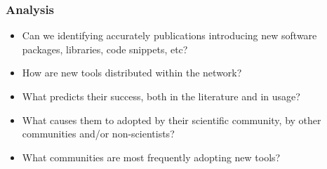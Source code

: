 \documentclass{beamer}
\begin{document}
\begin{frame}
\frametitle{Analysis}
\begin{itemize}
\item Can we identifying accurately publications introducing new software packages, libraries, code snippets, etc?

\item How are new tools distributed within the network? 

\item What predicts their success, both in the literature and in usage?

\item What causes them to adopted by their scientific community, by other communities and/or non-scientists? 

\item What communities are most frequently adopting new tools? 
\end{itemize}
\end{frame}
\end{document}
